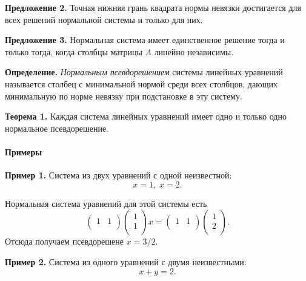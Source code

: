 \documentclass[11pt,a4paper]{article}
\begin{document}
\textbf{Предложение 2.} Точная нижняя грань квадрата нормы невязки
достигается для всех решений нормальной системы и только для них.

\textbf{Предложение 3.} Нормальная система имеет единственное решение
тогда и только тогда, когда столбцы матрицы \(A\) линейно независимы.

\textbf{Определение.} \emph{Нормальным псевдорешением} системы линейных
уравнений называется столбец с минимальной нормой среди всех столбцов,
дающих минимальную по норме невязку при подстановке в эту систему.

\textbf{Теорема 1.} Каждая система линейных уравнений имеет одно и
только одно нормальное псевдорешение.

    \hypertarget{ux43fux440ux438ux43cux435ux440ux44b}{%
\paragraph{Примеры}\label{ux43fux440ux438ux43cux435ux440ux44b}}

\textbf{Пример 1.} Система из двух уравнений с одной неизвестной:
\[ x=1, \; x=2. \]

Нормальная система уравнений для этой системы есть \[
  \begin{pmatrix}
    1 & 1 \\
  \end{pmatrix}
  \begin{pmatrix}
    1 \\
    1 \\
  \end{pmatrix}
  x = 
  \begin{pmatrix}
    1 & 1 \\
  \end{pmatrix}
  \begin{pmatrix}
    1 \\
    2 \\
  \end{pmatrix}.
\] Отсюда получаем псевдорешене \(x = 3/2\).

    \textbf{Пример 2.} Система из одного уравнений с двумя неизвестными:
\[ x + y = 2. \]
\end{document}
